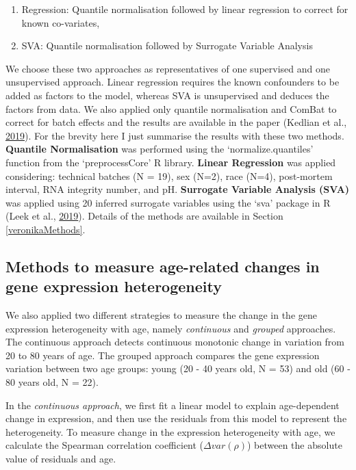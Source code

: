 \documentclass[12pt,twoside]{unicam}
\providecommand{\tightlist}{%
  \setlength{\itemsep}{0pt}\setlength{\parskip}{0pt}}
\begin{document}
\begin{enumerate}
\def\labelenumi{\arabic{enumi}.}
\tightlist
\item
  Regression: Quantile normalisation followed by linear regression to correct for known co-variates,
\item
  SVA: Quantile normalisation followed by Surrogate Variable Analysis
\end{enumerate}

We choose these two approaches as representatives of one supervised and one unsupervised approach. Linear regression requires the known confounders to be added as factors to the model, whereas SVA is unsupervised and deduces the factors from data. We also applied only quantile normalisation and ComBat to correct for batch effects and the results are available in the paper (Kedlian et al., \protect\hyperlink{ref-Kedlian2019}{2019}). For the brevity here I just summarise the results with these two methods. \textbf{Quantile Normalisation} was performed using the `normalize.quantiles' function from the `preprocessCore' R library. \textbf{Linear Regression} was applied considering: technical batches (N = 19), sex (N=2), race (N=4), post-mortem interval, RNA integrity number, and pH. \textbf{Surrogate Variable Analysis (SVA)} was applied using 20 inferred surrogate variables using the `sva' package in R (Leek et al., \protect\hyperlink{ref-svapack}{2019}). Details of the methods are available in Section \ref{veronikaMethods}.

\hypertarget{methods-to-measure-age-related-changes-in-gene-expression-heterogeneity}{%
\subsection{Methods to measure age-related changes in gene expression heterogeneity}\label{methods-to-measure-age-related-changes-in-gene-expression-heterogeneity}}

We also applied two different strategies to measure the change in the gene expression heterogeneity with age, namely \emph{continuous} and \emph{grouped} approaches. The continuous approach detects continuous monotonic change in variation from 20 to 80 years of age. The grouped approach compares the gene expression variation between two age groups: young (20 - 40 years old, N = 53) and old (60 - 80 years old, N = 22).

In the \emph{continuous approach}, we first fit a linear model to explain age-dependent change in expression, and then use the residuals from this model to represent the heterogeneity. To measure change in the expression heterogeneity with age, we calculate the Spearman correlation coefficient (\(\Delta var (\rho)\)) between the absolute value of residuals and age.
\end{document}

